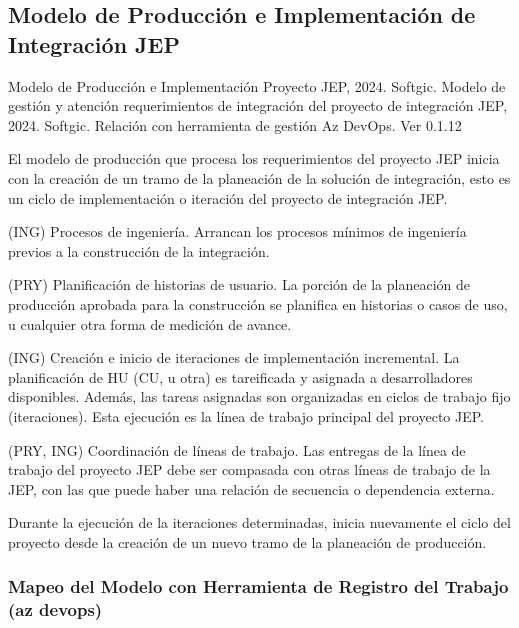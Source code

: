 \documentclass[
  paper=a4,
  ,captions=tableheading
]{scrartcl}
\renewenvironment{quote}{\begin{customblockquote}\list{}{\rightmargin=0em\leftmargin=0em}%
\item\relax\color{blockquote-text}\ignorespaces}{\unskip\unskip\endlist\end{customblockquote}}
\begin{document}
\subsection{Modelo de Producción e Implementación de Integración
JEP}\label{sec:modelo-de-producciuxf3n-e-implementaciuxf3n-de-integraciuxf3n-jep}

\begin{quote}
Modelo de Producción e Implementación Proyecto JEP, 2024. Softgic.
Modelo de gestión y atención requerimientos de integración del proyecto
de integración JEP, 2024. Softgic. Relación con herramienta de gestión
Az DevOps. Ver 0.1.12
\end{quote}

El modelo de producción que procesa los requerimientos del proyecto JEP
inicia con la creación de un tramo de la planeación de la solución de
integración, esto es un ciclo de implementación o iteración del proyecto
de integración JEP.

(ING) Procesos de ingeniería. Arrancan los procesos mínimos de
ingeniería previos a la construcción de la integración.

(PRY) Planificación de historias de usuario. La porción de la planeación
de producción aprobada para la construcción se planifica en historias o
casos de uso, u cualquier otra forma de medición de avance.

(ING) Creación e inicio de iteraciones de implementación incremental. La
planificación de HU (CU, u otra) es tareificada y asignada a
desarrolladores disponibles. Además, las tareas asignadas son
organizadas en ciclos de trabajo fijo (iteraciones). Esta ejecución es
la línea de trabajo principal del proyecto JEP.

(PRY, ING) Coordinación de líneas de trabajo. Las entregas de la línea
de trabajo del proyecto JEP debe ser compasada con otras líneas de
trabajo de la JEP, con las que puede haber una relación de secuencia o
dependencia externa.

Durante la ejecución de la iteraciones determinadas, inicia nuevamente
el ciclo del proyecto desde la creación de un nuevo tramo de la
planeación de producción.

\subsubsection{Mapeo del Modelo con Herramienta de Registro del Trabajo
(az
devops)}\label{sec:mapeo-del-modelo-con-herramienta-de-registro-del-trabajo-az-devops}
\end{document}
